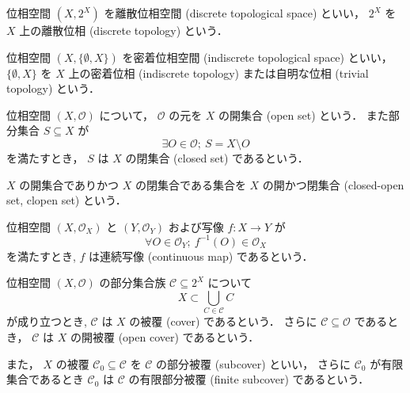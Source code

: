 \documentclass[titlepage]{ltjsreport}
\begin{document}
\begin{definition}[離散位相]
  位相空間 $(X,2^X)$ を離散位相空間 (discrete topological space) といい，
  $2^X$ を $X$ 上の離散位相 (discrete topology) という．
\end{definition}

\begin{definition}[密着位相]
  位相空間 $(X,\{\emptyset,X\})$
  を密着位相空間 (indiscrete topological space) といい，
  $\{\emptyset,X\}$ を $X$ 上の密着位相 (indiscrete topology)
  または自明な位相 (trivial topology) という．
\end{definition}

\begin{definition}
  位相空間 $(X,\mathcal{O})$ について，
  $\mathcal{O}$ の元を $X$ の開集合 (open set) という．
  また部分集合 $S\subseteq X$ が
  \begin{equation}
    \exists O\in\mathcal{O};\ S=X\setminus O
  \end{equation}
  を満たすとき，
  $S$ は $X$ の閉集合 (closed set) であるという．

  $X$ の開集合でありかつ $X$ の閉集合である集合を
  $X$ の開かつ閉集合 (closed-open set, clopen set) という．
\end{definition}

\begin{definition}[連続写像]\label{def:continuous-map}
  位相空間 $(X,\mathcal{O}_X)$ と $(Y,\mathcal{O}_Y)$ および写像 $f:X\to Y$ が
  \begin{equation}
    \forall O\in\mathcal{O}_Y;\ f^{-1}(O)\in\mathcal{O}_X
  \end{equation}
  を満たすとき,
  $f$ は連続写像 (continuous map) であるという．
\end{definition}

\begin{definition}
  位相空間 $(X,\mathcal{O})$ の部分集合族 $\mathcal{C}\subseteq2^X$ について
  \begin{equation}
    X\subset\bigcup_{C\in\mathcal{C}}C
  \end{equation}
  が成り立つとき,
  $\mathcal{C}$ は $X$ の被覆 (cover) であるという．
  さらに $\mathcal{C}\subseteq\mathcal{O}$ であるとき，
  $\mathcal{C}$ は $X$ の開被覆 (open cover) であるという．

  また，
  $X$ の被覆 $\mathcal{C}_0\subseteq\mathcal{C}$ を
  $\mathcal{C}$ の部分被覆 (subcover) といい，
  さらに $\mathcal{C}_0$ が有限集合であるとき
  $\mathcal{C}_0$ は $\mathcal{C}$ の有限部分被覆 (finite subcover) であるという．
\end{definition}
\end{document}

